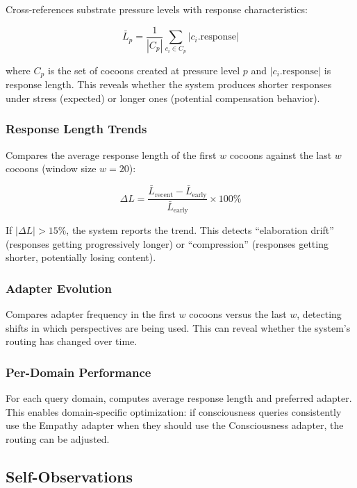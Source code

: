 Cross-references substrate pressure levels with response characteristics:

\begin{equation}
\bar{L}_p = \frac{1}{|C_p|} \sum_{c_i \in C_p} |c_i.\text{response}|
\end{equation}

where $C_p$ is the set of cocoons created at pressure level $p$ and
$|c_i.\text{response}|$ is response length. This reveals whether the system
produces shorter responses under stress (expected) or longer ones (potential
compensation behavior).

\subsubsection{Response Length Trends}

Compares the average response length of the first $w$ cocoons against the
last $w$ cocoons (window size $w = 20$):

\begin{equation}
\Delta L = \frac{\bar{L}_{\text{recent}} - \bar{L}_{\text{early}}}{\bar{L}_{\text{early}}} \times 100\%
\end{equation}

If $|\Delta L| > 15\%$, the system reports the trend. This detects
``elaboration drift'' (responses getting progressively longer) or
``compression'' (responses getting shorter, potentially losing content).

\subsubsection{Adapter Evolution}

Compares adapter frequency in the first $w$ cocoons versus the last $w$,
detecting shifts in which perspectives are being used. This can reveal
whether the system's routing has changed over time.

\subsubsection{Per-Domain Performance}

For each query domain, computes average response length and preferred
adapter. This enables domain-specific optimization: if consciousness
queries consistently use the Empathy adapter when they should use the
Consciousness adapter, the routing can be adjusted.

\subsection{Self-Observations}


